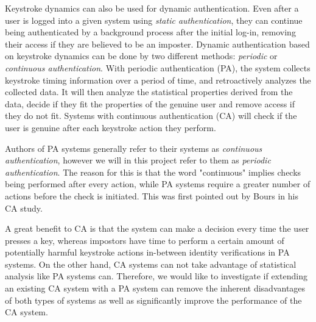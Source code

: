 \documentclass[informationsecurity]{gucmasterproject}
\begin{document}
Keystroke dynamics can also be used for dynamic authentication.
Even after a user is logged into a given system using \textit{static authentication}, they can continue being authenticated by a background process after the initial log-in, removing their access if they are believed to be an imposter.
Dynamic authentication based on keystroke dynamics can be done by two different methods: \textit{periodic} or \textit{continuous authentication}.
With periodic authentication (PA), the system collects keystroke timing information over a period of time, and retroactively analyzes the collected data.
It will then analyze the statistical properties derived from the data, decide if they fit the properties of the genuine user and remove access if they do not fit.
Systems with continuous authentication (CA) will check if the user is genuine after each keystroke action they perform.

Authors of PA systems generally refer to their systems as \textit{continuous authentication}, however we will in this project refer to them as \textit{periodic authentication}. 
The reason for this is that the word "continuous" implies checks being performed after every action, while PA systems require a greater number of actions before the check is initiated. 
This was first pointed out by Bours \cite{BOURS201236} in his CA study.

A great benefit to CA is that the system can make a decision every time the user presses a key, whereas impostors have time to perform a certain amount of potentially harmful keystroke actions in-between identity verifications in PA systems.
On the other hand, CA systems can not take advantage of statistical analysis like PA systems can.
Therefore, we would like to investigate if extending an existing CA system with a PA system can remove the inherent disadvantages of both types of systems as well as significantly improve the performance of the CA system.
\end{document}
